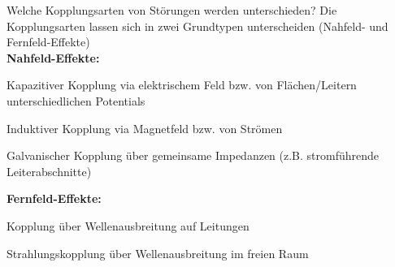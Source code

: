 \begin{karte}{Welche Kopplungsarten von Störungen werden unterschieden?}
	Die Kopplungsarten lassen sich in zwei Grundtypen unterscheiden (Nahfeld- und Fernfeld-Effekte)\\[4pt]
	\textbf{Nahfeld-Effekte:}
	\begin{compactitem}
		\item Kapazitiver Kopplung via elektrischem Feld bzw. von Flächen/Leitern unterschiedlichen Potentials
		\item Induktiver Kopplung via Magnetfeld bzw. von Strömen
		\item Galvanischer Kopplung über gemeinsame Impedanzen (z.B. stromführende Leiterabschnitte)
	\end{compactitem}
	\vspace{4pt}
	\textbf{Fernfeld-Effekte:}
	\begin{compactitem}
		\item Kopplung über Wellenausbreitung auf Leitungen
		\item Strahlungskopplung über Wellenausbreitung im freien Raum
	\end{compactitem}
\end{karte}
